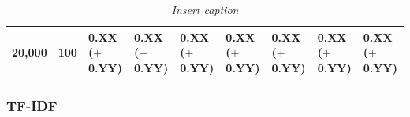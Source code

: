 \documentclass[a4paper,twoside,phd]{BYUPhys}
\begin{document}
\begin{table}[H]
\begin{tabular}{|p{1.7cm}|p{1.65cm}|p{1.65cm}|p{1.65cm}|p{1.6cm}|p{1.65cm}|p{1.65cm}|p{1.65cm}|p{1.65cm}|}
		20,000  & 100 & 0.XX \newline ($\pm$ 0.YY) & 0.XX \newline ($\pm$ 0.YY) & 0.XX \newline ($\pm$ 0.YY) & 0.XX \newline ($\pm$ 0.YY) & 0.XX \newline ($\pm$ 0.YY)  & 0.XX \newline ($\pm$ 0.YY)   & 0.XX \newline ($\pm$ 0.YY)  \\
		\hline
		
		
		
	\end{tabular}
	\caption{\textit{Insert caption}}
	\label{table:BoWStorage}
\end{table}

\subsubsection{TF-IDF}
\label{sec:TFIDFStorageRequirements}
\end{document}
